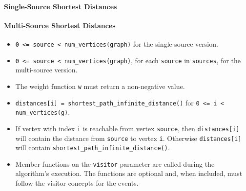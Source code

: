\paragraph{Single-Source Shortest Distances}
{\small
      
}

\paragraph{Multi-Source Shortest Distances}
{\small
      
}

\begin{itemdescr}
      \pnum\mandates
            \begin{itemize}
                  \item
                        \lstinline{0 <= source < num_vertices(graph)} for the single-source version. 
                  \item
                        \lstinline{0 <= source < num_vertices(graph)}, for each \lstinline{source} in \lstinline{sources}, 
                                   for the multi-source version.
                  \item
                        The weight function \lstinline{w} must return a non-negative value.
            \end{itemize}
      \pnum\preconditions
            \begin{itemize}
                  \item
                        \lstinline{distances[i] = shortest_path_infinite_distance()} for \lstinline{0 <= i < num_vertices(g)}.
            \end{itemize}
      \pnum\effects
            \begin{itemize}
                  \item
                        If vertex with index \lstinline{i} is reachable from vertex \lstinline{source}, then
                        \lstinline{distances[i]} will contain the distance from \lstinline{source} to vertex
                        \lstinline{i}.  Otherwise \lstinline{distances[i]} will contain
                        \lstinline{shortest_path_infinite_distance()}.
                  \item Member functions on the \lstinline{visitor} parameter are called during the algorithm's execution.
                        The functions are optional and, when included, must follow the visitor concepts for the events.

\end{itemize}
\end{itemdescr}

